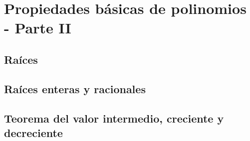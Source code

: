 \chapter[Propiedades básicas. Segunda parte]{Propiedades básicas de polinomios - Parte II}

\section{Raíces}


\section{Raíces enteras y racionales}

\section{Teorema del valor intermedio, creciente y decreciente}